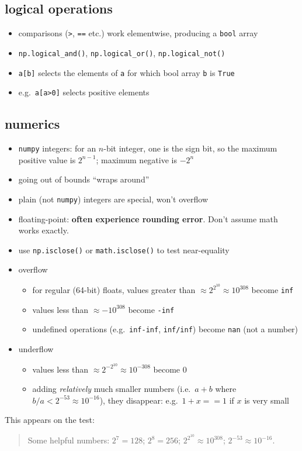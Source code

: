 \documentclass[]{tufte-handout}
\providecommand{\tightlist}{%
  \setlength{\itemsep}{0pt}\setlength{\parskip}{0pt}}
\begin{document}
\hypertarget{logical-operations}{%
\subsection{logical operations}\label{logical-operations}}

\begin{itemize}
\tightlist
\item
  comparisons (\texttt{\textgreater{}}, \texttt{==} etc.) work
  elementwise, producing a \texttt{bool} array
\item
  \texttt{np.logical\_and()}, \texttt{np.logical\_or()},
  \texttt{np.logical\_not()}
\item
  \texttt{a{[}b{]}} selects the elements of \texttt{a} for which bool
  array \texttt{b} is \texttt{True}
\item
  e.g.~\texttt{a{[}a\textgreater{}0{]}} selects positive elements
\end{itemize}

\hypertarget{numerics}{%
\subsection{numerics}\label{numerics}}

\begin{itemize}
\tightlist
\item
  \texttt{numpy} integers: for an \(n\)-bit integer, one is the sign
  bit, so the maximum positive value is \(2^{n-1}\); maximum negative is
  \(-2^n\)
\item
  going out of bounds ``wraps around''
\item
  plain (not \texttt{numpy}) integers are special, won't overflow
\item
  floating-point: \textbf{often experience rounding error}. Don't assume
  math works exactly.
\item
  use \texttt{np.isclose()} or \texttt{math.isclose()} to test
  near-equality
\item
  overflow

  \begin{itemize}
  \tightlist
  \item
    for regular (64-bit) floats, values greater than
    \(\approx 2^{2^{10}} \approx 10^{308}\) become \texttt{inf}
  \item
    values less than \(\approx -10^{308}\) become \texttt{-inf}
  \item
    undefined operations (e.g.~\texttt{inf-inf}, \texttt{inf/inf})
    become \texttt{nan} (not a number)
  \end{itemize}
\item
  underflow

  \begin{itemize}
  \tightlist
  \item
    values less than \(\approx 2^{-2^{10}} \approx 10^{-308}\) become 0
  \item
    adding \emph{relatively} much smaller numbers (i.e.~\(a+b\) where
    \(b/a \lt 2^{-53} \approx 10^{-16}\)), they disappear:
    e.g.~\(1+x==1\) if \(x\) is very small
  \end{itemize}
\end{itemize}

This appears on the test:

\begin{quote}
Some helpful numbers: \(2^7=128\); \(2^8=256\);
\(2^{2^{10}} \approx 10^{308}\); \(2^{-53} \approx 10^{-16}\).
\end{quote}
\end{document}

